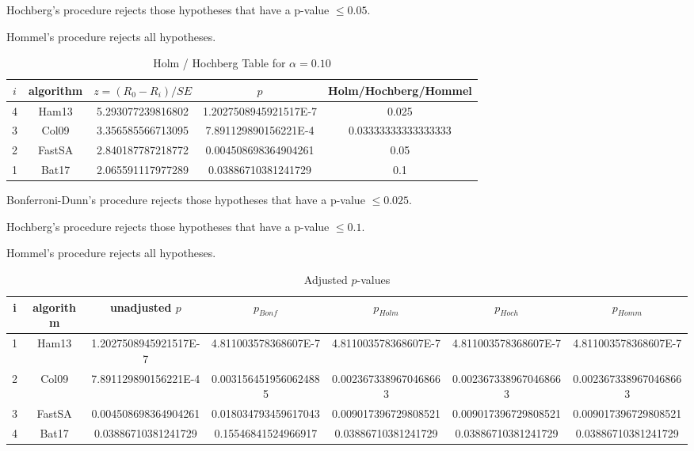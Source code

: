 \documentclass[a4paper,10pt]{article}
\begin{document}
\begin{landscape}
Hochberg's procedure rejects those hypotheses that have a p-value $\le0.05$.


Hommel's procedure rejects all hypotheses.


\begin{table}[!htp]
\centering\tiny
\caption{Holm / Hochberg Table for $\alpha=0.10$}
\begin{tabular}{ccccc}
$i$&algorithm&$z=(R_0 - R_i)/SE$&$p$&Holm/Hochberg/Hommel\\
\hline
4&Ham13&5.293077239816802&1.2027508945921517E-7&0.025\\
3&Col09&3.356585566713095&7.891129890156221E-4&0.03333333333333333\\
2&FastSA&2.840187787218772&0.004508698364904261&0.05\\
1&Bat17&2.065591117977289&0.03886710381241729&0.1\\
\hline
\end{tabular}
\end{table}
Bonferroni-Dunn's procedure rejects those hypotheses that have a p-value $\le0.025$.


Hochberg's procedure rejects those hypotheses that have a p-value $\le0.1$.


Hommel's procedure rejects all hypotheses.


\begin{table}[!htp]
\centering\tiny
\caption{Adjusted $p$-values}
\begin{tabular}{ccccccc}
i&algorithm&unadjusted $p$&$p_{Bonf}$&$p_{Holm}$&$p_{Hoch}$&$p_{Homm}$\\
\hline
1&Ham13&1.2027508945921517E-7&4.811003578368607E-7&4.811003578368607E-7&4.811003578368607E-7&4.811003578368607E-7\\
2&Col09&7.891129890156221E-4&0.0031564519560624885&0.0023673389670468663&0.0023673389670468663&0.0023673389670468663\\
3&FastSA&0.004508698364904261&0.018034793459617043&0.009017396729808521&0.009017396729808521&0.009017396729808521\\
4&Bat17&0.03886710381241729&0.15546841524966917&0.03886710381241729&0.03886710381241729&0.03886710381241729\\
\hline
\end{tabular}
\end{table}


\end{landscape}
\end{document}
